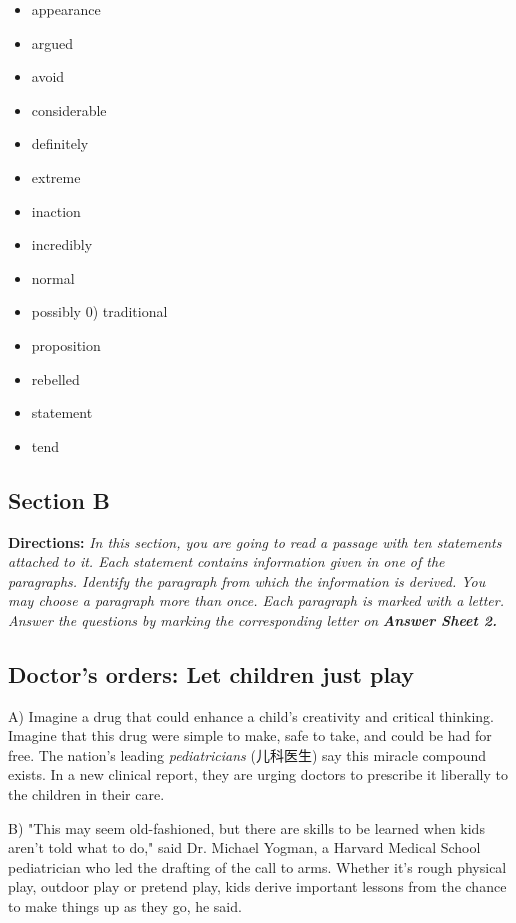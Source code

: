 \documentclass[UTF8,11pt]{ctexart}
\begin{document}
\begin{itemize}[leftmargin=2em,itemsep=.2em,topsep=.4em]\item[A.] appearance
\item[B.] argued
\item[C.] avoid
\item[D.] considerable
\item[E.] definitely
\item[F.] extreme
\item[G.] inaction
\item[H.] incredibly
\item[I.] normal
\item[J.] possibly 0) traditional
\item[K.] proposition
\item[L.] rebelled
\item[M.] statement
\item[N.] tend
\end{itemize}

\subsection*{\textbf{Section B}}


\textbf{Directions: }\textit{In this section, you are going to read a passage with ten statements attached to it. Each} \textit{statement contains information given in one of the paragraphs. Identify the paragraph from which the} \textit{information is derived. You may choose a paragraph more than once. Each paragraph is marked with a} \textit{letter. Answer the questions by marking the corresponding letter on }\textbf{\textit{Answer Sheet 2.}}


\subsection*{\textbf{Doctor's orders: Let children just play}}


A) Imagine a drug that could enhance a child's creativity and critical thinking. Imagine that this drug were simple to make, safe to take, and could be had for free. The nation's leading \textit{pediatricians }(儿科医生) say this miracle compound exists. In a new clinical report, they are urging doctors to prescribe it liberally to the children in their care.


B) "This may seem old-fashioned, but there are skills to be learned when kids aren't told what to do," said Dr. Michael Yogman, a Harvard Medical School pediatrician who led the drafting of the call to arms. Whether it's rough physical play, outdoor play or pretend play, kids derive important lessons from the chance to make things up as they go, he said.
\end{document}
